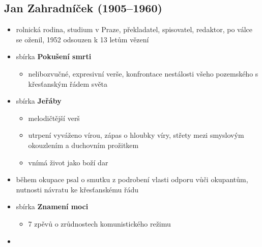 \subsection{Jan Zahradníček (1905--1960)}
\begin{itemize}
\item rolnická rodina, studium v Praze, překladatel, spisovatel, redaktor, po válce se oženil, 1952 odsouzen k 13 letům vězení
\item sbírka \textbf{Pokušení smrti}
	\begin{itemize}
	\item nelibozvučné, expresivní verše, konfrontace nestálosti všeho pozemského s křesťanským řádem světa
	\end{itemize}
\item sbírka \textbf{Jeřáby}
	\begin{itemize}
	\item melodičtější verš
	\item utrpení vyváženo vírou, zápas o hloubky víry, střety mezi smyslovým okouzlením a duchovním prožitkem
	\item vnímá život jako boží dar
	\end{itemize}
\item během okupace psal o smutku z podrobení vlasti odporu vůči okupantům, nutnosti návratu ke křesťanskému řádu 
\item sbírka \textbf{Znamení moci}
	\begin{itemize}
	\item 7 zpěvů o zrůdnostech komunistického režimu
	\end{itemize}
\item 
\end{itemize}


